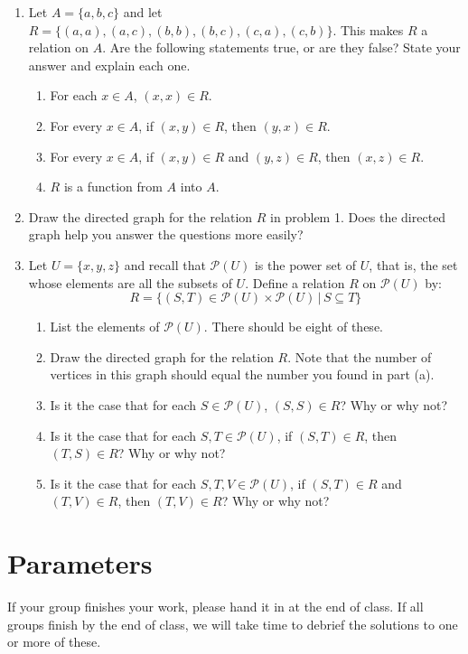 \documentclass[11pt]{article}
\begin{document}
\begin{enumerate}
	
	\item Let $A = \{ a,b,c\}$ and let $R = \{ (a,a), (a,c), (b,b), (b,c), (c,a), (c,b)\}$. This makes $R$ a relation on $A$. Are the following statements true, or are they false? State your answer and explain each one. 
	\begin{enumerate}
		\item For each $x \in A$, $(x,x) \in R$. 
		\item For every $x \in A$, if $(x,y) \in R$, then $(y,x) \in R$. 
		\item For every $x \in A$, if $(x,y) \in R$ and $(y,z) \in R$, then $(x,z) \in R$. 
		\item $R$ is a function from $A$ into $A$. 
	\end{enumerate}
	
	\item Draw the directed graph for the relation $R$ in problem 1. Does the directed graph help you answer the questions more easily? 
	
	\item Let $U = \{x,y,z\}$ and recall that $\mathcal{P}(U)$ is the power set of $U$, that is, the set whose elements are all the subsets of $U$. Define a relation $R$ on $\mathcal{P}(U)$ by: 
\[ R = \{ (S, T) \in \mathcal{P}(U) \times \mathcal{P}(U) \, | \, S \subseteq T \} \]
	\begin{enumerate}
		\item List the elements of $\mathcal{P}(U)$. There should be eight of these. 
		\item Draw the directed graph for the relation $R$. Note that the number of vertices in this graph should equal the number you found in part (a). 
		\item Is it the case that for each $S \in \mathcal{P}(U)$, $(S,S) \in R$? Why or why not? 
		\item Is it the case that for each $S,T \in \mathcal{P}(U)$, if $(S,T) \in R$, then $(T,S) \in R$? Why or why not? 
		\item Is it the case that for each $S,T, V \in \mathcal{P}(U)$, if $(S,T) \in R$ and $(T,V) \in R$, then $(T,V) \in R$? Why or why not? 
	\end{enumerate}


	
\end{enumerate}

\section*{Parameters}

If your group finishes your work, please hand it in at the end of class. If all groups finish by the end of class, we will take time to debrief the solutions to one or more of these. 
\end{document}
